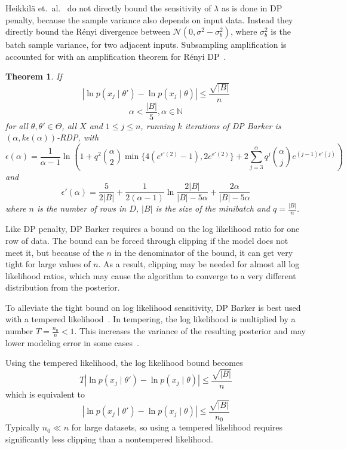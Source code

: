 \documentclass[english,twoside,openright]{HYgraduMLDS}
\newtheorem{theorem}{Theorem}
\newcommand{\N}{\mathbb{N}}
\newcommand{\caln}{{\mathcal{N}}}
\begin{document}
Heikkilä et.\ al.~\cite{HeikkilaJDH19} do not directly bound the sensitivity 
of \(\lambda\) as is done in DP penalty, because the sample variance also 
depends on input data. Instead they directly bound the Rényi divergence 
between \(\caln(0, \sigma^2 - \sigma^2_b)\), where \(\sigma^2_b\) is the 
batch sample variance, for two adjacent inputs. Subsampling amplification 
is accounted for with an amplification theorem for Rényi DP~\cite{WangBK19}.

\begin{theorem}\label{dp_barker_theorem}
    If 
    \[
        |\ln p(x_j\mid \theta') - \ln p(x_j\mid \theta)| \leq \frac{\sqrt{|B|}}{n}
    \]
    \[
        \alpha < \frac{|B|}{5}, \alpha \in \N
    \]
    for all \(\theta, \theta' \in \Theta\), all \(X\) and \(1\leq j \leq n\),
    running \(k\) iterations of DP Barker is \((\alpha, k\epsilon(\alpha))\)-RDP, 
    with 
    \[
        \epsilon(\alpha) = \frac{1}{\alpha - 1}\ln \left(
        1 + q^2\binom{\alpha}{2}\min\{4(e^{\epsilon'(2)} - 1), 2e^{\epsilon'(2)}\}
        + 2 \sum_{j=3}^\alpha q^j\binom{\alpha}{j}e^{(j-1)\epsilon'(j)}\right)
    \]
    and 
    \[
        \epsilon'(\alpha) = \frac{5}{2|B|} + \frac{1}{2(\alpha - 1)}
        \ln \frac{2|B|}{|B| - 5\alpha} + \frac{2\alpha}{|B| - 5\alpha}
    \]
    where \(n\) is the number of rows in \(D\), \(|B|\) is the size of the 
    minibatch and \(q = \frac{|B|}{n}\).
\end{theorem}

Like DP penalty, DP Barker requires a bound on the log likelihood ratio for 
one row of data. The bound can be forced through clipping if the model does not 
meet it, but because of the \(n\) in the denominator of the bound, it can get 
very tight for large values of \(n\). As a result, clipping may be needed for 
almost all log likelihood ratios, which may cause the algorithm to converge 
to a very different distribution from the posterior.

To alleviate the tight bound on log likelihood sensitivity, DP Barker is best 
used with a tempered likelihood~\cite{HeikkilaJDH19}. In tempering, the 
log likelihood is multiplied by a number \(T = \frac{n_0}{n} < 1\). This 
increases the variance of the resulting posterior and may lower modeling 
error in some cases~\cite{HeikkilaJDH19}.

Using the tempered likelihood, the log likelihood 
bound becomes 
\[
    T|\ln p(x_j\mid \theta') - \ln p(x_j\mid \theta)|
    \leq \frac{\sqrt{|B|}}{n}
\]
which is equivalent to 
\[
    |\ln p(x_j\mid \theta') - \ln p(x_j\mid \theta)|
    \leq \frac{\sqrt{|B|}}{n_0}
\]
Typically \(n_0 \ll n\) for large datasets, so using a tempered likelihood requires 
significantly less clipping than a nontempered likelihood.
\end{document}
